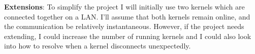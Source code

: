 \documentclass[11pt, a4paper]{article}
\begin{document}
\textbf{Extensions}: To simplify the project I will initially use two kernels 
which are connected together on a LAN. I'll assume that both kernels remain 
online, and the communication be relatively instantaneous. However, if the 
project needs extending, I could increase the number of running kernels and I 
could also look into how to resolve when a kernel disconnects unexpectedly.
\end{document}
